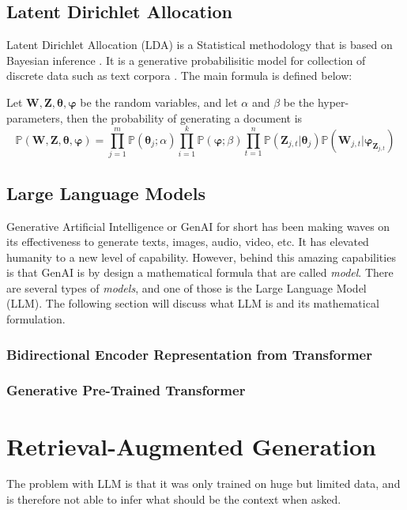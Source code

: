 \subsection{Latent Dirichlet Allocation}\label{sec:lda}
Latent Dirichlet Allocation (LDA) is a Statistical methodology that is based on Bayesian inference \cite{bayes,laplace1986}. It is a generative probabilisitic model for collection of discrete data such as text corpora \cite{blei2003latent}. The main formula is defined below:
\begin{defnx}
Let $\mathbf{W},\mathbf{Z},\boldsymbol{\theta},\boldsymbol{\varphi}$ be the random variables, and let $\alpha$ and $\beta$ be the hyper-parameters, then the probability of generating a document is
\begin{equation}
    \mathbb{P}(\mathbf{W},\mathbf{Z},\boldsymbol{\theta},\boldsymbol{\varphi})=\prod_{j=1}^m\mathbb{P}(\boldsymbol{\theta}_j;\alpha)\prod_{i=1}^{k}\mathbb{P}(\boldsymbol{\varphi};\beta)\prod_{t=1}^{n}\mathbb{P}(\mathbf{Z}_{j,t}|\boldsymbol{\theta}_j)\mathbb{P}(\mathbf{W}_{j,t}|\boldsymbol{\varphi}_{\mathbf{Z}_{j,t}})
\end{equation}
\end{defnx}
\subsection{Large Language Models}\label{sec:llm_method}
Generative Artificial Intelligence or GenAI for short has been making waves on its effectiveness to generate texts, images, audio, video, etc. It has elevated humanity to a new level of capability. However, behind this amazing capabilities is that GenAI is by design a mathematical formula that are called \textit{model}. There are several types of \textit{models}, and one of those is the Large Language Model (LLM). The following section will discuss what LLM is and its mathematical formulation.
\subsubsection{Bidirectional Encoder Representation from Transformer}
\subsubsection{Generative Pre-Trained Transformer}
\section{Retrieval-Augmented Generation}
The problem with LLM is that it was only trained on huge but limited data, and is therefore not able to infer what should be the context when asked.
